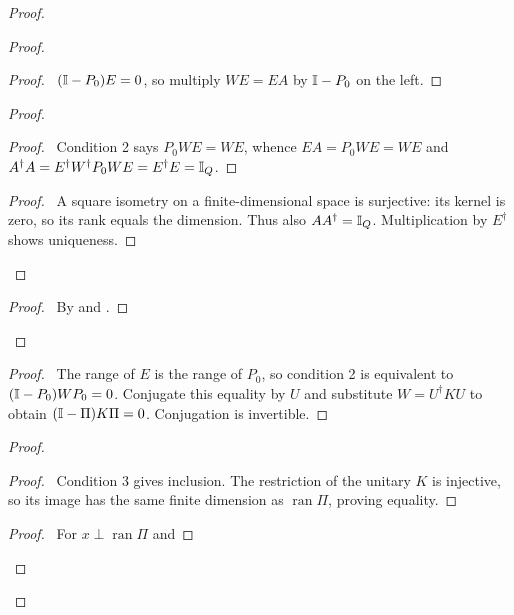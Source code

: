 \begin{proof}
 \begin{proof}
  \begin{proof}\pf\ $(\mathbb{I}-P_0)E=0$, so multiply $WE=EA$ by
  $\mathbb{I}-P_0$ on the left.
  \end{proof}
  \begin{proof}
   \begin{proof}\pf\ Condition 2 says $P_0WE=WE$, whence
   $EA=P_0WE=WE$ and
   $A^\dagger A=E^\dagger W^\dagger P_0WE=E^\dagger E=\mathbb{I}_Q$.
   \end{proof}
   \qedstep
   \begin{proof}\pf\ A square isometry on a finite-dimensional space
   is surjective: its kernel is zero, so its rank equals the dimension.
   Thus also $AA^\dagger=\mathbb{I}_Q$. Multiplication by $E^\dagger$ shows
   uniqueness.
   \end{proof}
  \end{proof}
  \qedstep
  \begin{proof}\pf\ By  and
  .
  \end{proof}
 \end{proof}
 \begin{proof}\pf\ The range of $E$ is the range of $P_0$, so
 condition 2 is equivalent to $(\mathbb{I}-P_0)WP_0=0$. Conjugate this
 equality by $U$ and substitute $W=U^\dagger KU$ to obtain
 $(\mathbb{I}-\Pi)K\Pi=0$. Conjugation is invertible.
 \end{proof}
 \begin{proof}
  \begin{proof}\pf\ Condition 3 gives inclusion. The restriction of
  the unitary $K$ is injective, so its image has the same finite
  dimension as $\operatorname{ran}\Pi$, proving equality.
  \end{proof}
  \begin{proof}\pf\ For $x\perp\operatorname{ran}\Pi$ and

\end{proof}
\end{proof}
\end{proof}
